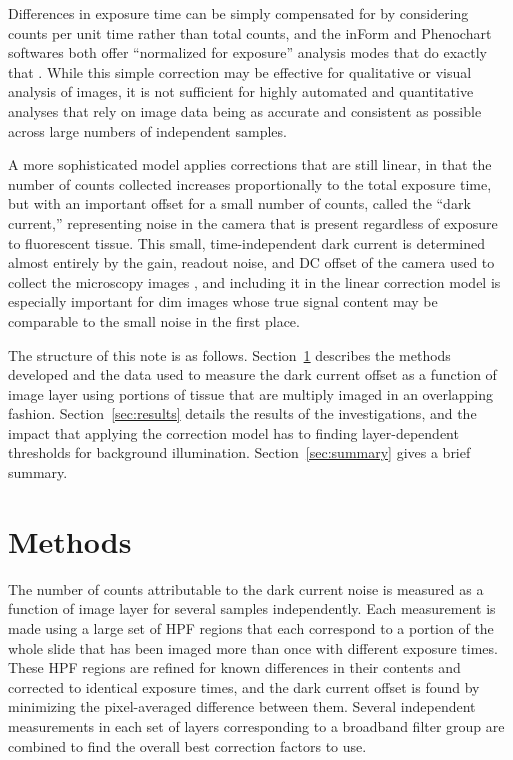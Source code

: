 \documentclass[letterpaper,11pt]{article}
\newcommand{\refsec}[1]{Section~\ref{#1}}
\begin{document}
Differences in exposure time can be simply compensated for by considering counts per unit time rather than total counts, and the inForm and Phenochart softwares both offer ``normalized for exposure'' analysis modes that do exactly that \cite{inform_user_manual,phenochart_user_manual}. While this simple correction may be effective for qualitative or visual analysis of images, it is not sufficient for highly automated and quantitative analyses that rely on image data being as accurate and consistent as possible across large numbers of independent samples. 

A more sophisticated model applies corrections that are still linear, in that the number of counts collected increases proportionally to the total exposure time, but with an important offset for a small number of counts, called the ``dark current,'' representing noise in the camera that is present regardless of exposure to fluorescent tissue. This small, time-independent dark current is determined almost entirely by the gain, readout noise, and DC offset of the camera used to collect the microscopy images \cite{doi:10.1111/j.1365-2818.2011.03581.x}, and including it in the linear correction model is especially important for dim images whose true signal content may be comparable to the small noise in the first place.

The structure of this note is as follows. \refsec{sec:methods} describes the methods developed and the data used to measure the dark current offset as a function of image layer using portions of tissue that are multiply imaged in an overlapping fashion. \refsec{sec:results} details the results of the investigations, and the impact that applying the correction model has to finding layer-dependent thresholds for background illumination. \refsec{sec:summary} gives a brief summary.

\section{Methods}
\label{sec:methods}

The number of counts attributable to the dark current noise is measured as a function of image layer for several samples independently. Each measurement is made using a large set of HPF regions that each correspond to a portion of the whole slide that has been imaged more than once with different exposure times. These HPF regions are refined for known differences in their contents and corrected to identical exposure times, and the dark current offset is found by minimizing the pixel-averaged difference between them. Several independent measurements in each set of layers corresponding to a broadband filter group are combined to find the overall best correction factors to use. 
\end{document}
